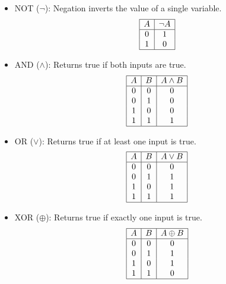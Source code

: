 \begin{itemize}[noitemsep, topsep=0pt]
    \item NOT (\( \neg \)): Negation inverts the value of a single variable.
    \[
    \begin{array}{|c|c|}
    \hline
    A & \neg A \\
    \hline
    0 & 1 \\
    1 & 0 \\
    \hline
    \end{array}
    \]
    
    \item AND (\( \land \)): Returns true if both inputs are true.
    \[
    \begin{array}{|c|c|c|}
    \hline
    A & B & A \land B \\
    \hline
    0 & 0 & 0 \\
    0 & 1 & 0 \\
    1 & 0 & 0 \\
    1 & 1 & 1 \\
    \hline
    \end{array}
    \]
    
    \item OR (\( \lor \)): Returns true if at least one input is true.
    \[
    \begin{array}{|c|c|c|}
    \hline
    A & B & A \lor B \\
    \hline
    0 & 0 & 0 \\
    0 & 1 & 1 \\
    1 & 0 & 1 \\
    1 & 1 & 1 \\
    \hline
    \end{array}
    \]

    \item XOR (\( \oplus \)): Returns true if exactly one input is true.
    \[
    \begin{array}{|c|c|c|}
    \hline
    A & B & A \oplus B \\
    \hline
    0 & 0 & 0 \\
    0 & 1 & 1 \\
    1 & 0 & 1 \\
    1 & 1 & 0 \\
    \hline
    \end{array}
    \]
\end{itemize}

